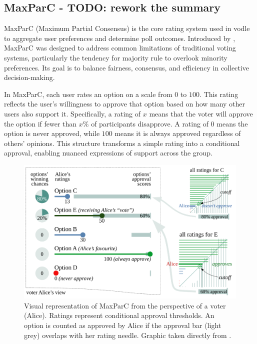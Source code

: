 
\subsection{MaxParC - TODO: rework the summary}
MaxParC (Maximum Partial Consensus) is the core rating system used in vodle to aggregate user preferences and determine poll outcomes. Introduced by \cite{heitzig_fair_2024}, MaxParC was designed to address common limitations of traditional voting systems, particularly the tendency for majority rule to overlook minority preferences. Its goal is to balance fairness, consensus, and efficiency in collective decision-making.

In MaxParC, each user rates an option on a scale from $0$ to $100$. This rating reflects the user's willingness to approve that option based on how many other users also support it. Specifically, a rating of $x$ means that the voter will approve the option if fewer than $x\%$ of participants disapprove. A rating of $0$ means the option is never approved, while $100$ means it is always approved regardless of others' opinions. This structure transforms a simple rating into a conditional approval, enabling nuanced expressions of support across the group.

\begin{figure}[H]
    \centering
    \includegraphics[width=0.8\linewidth]{../common/maxparc.png}
    \caption{Visual representation of MaxParC from the perspective of a voter (Alice). Ratings represent conditional approval thresholds. An option is counted as approved by Alice if the approval bar (light grey) overlaps with her rating needle. Graphic taken directly from \cite{heitzig_fair_2024}.}
\end{figure}

